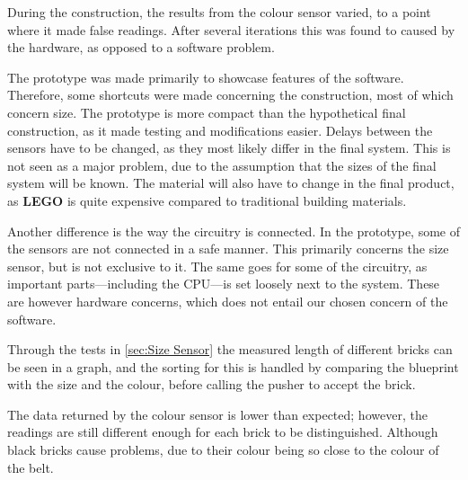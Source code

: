 During the construction, the results from the colour sensor varied, to a point where it made false readings.
After several iterations this was found to caused by the hardware, as opposed to a software problem. 

The prototype was made primarily to showcase features of the software.
Therefore, some shortcuts were made concerning the construction, most of which concern size.
The prototype is more compact than the hypothetical final construction, as it made testing and modifications easier.
Delays between the sensors have to be changed, as they most likely differ in the final system.
This is not seen as a major problem, due to the assumption that the sizes of the final system will be known.
The material will also have to change in the final product, as \textbf{LEGO} is quite expensive compared to traditional building materials.

Another difference is the way the circuitry is connected.
In the prototype, some of the sensors are not connected in a safe manner.
This primarily concerns the size sensor, but is not exclusive to it.
The same goes for some of the circuitry, as important parts---including the \ac{CPU}---is set loosely next to the system.
These are however hardware concerns, which does not entail our chosen concern of the software.

Through the tests in \ref{sec:Size Sensor} the measured length of different bricks can be seen in a graph, and the sorting for this is handled by comparing the blueprint with the size and the colour, before calling the pusher to accept the brick.

The data returned by the colour sensor is lower than expected; however, the readings are still different enough for each brick to be distinguished.
Although black bricks cause problems, due to their colour being so close to the colour of the belt. 



